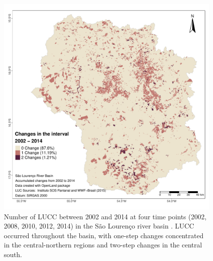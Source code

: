 \begin{Schunk}
\begin{figure}[h]

{\centering \includegraphics[width=1\linewidth,trim={0 0.5cm 0 0.5cm},clip]{figures/acc_mymap.pdf} 

}

\caption[Accumulated changes in pixels in the interval 2002 - 2014 at four time points (2002, 2008, 2010, 2012, 2014)]{Number of LUCC between 2002 and 2014 at four time points (2002, 2008, 2010, 2012, 2014) in the São Lourenço river basin \citep{sospantanal2015}. LUCC occurred throughout the basin, with one-step changes concentrated in the central-northern regions and two-step changes in the central south.}\label{fig:acchange}
\end{figure}
\end{Schunk}

